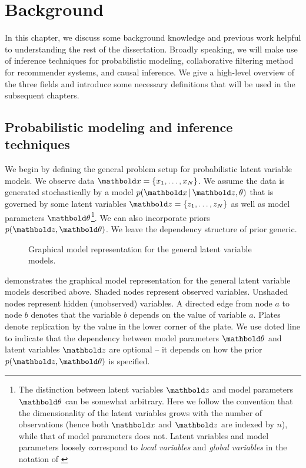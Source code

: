 

\chapter{Background}\label{chpt:background}

In this chapter, we discuss some background knowledge and previous work helpful to understanding the rest of the dissertation. 
Broadly speaking, we will make use of inference techniques for probabilistic modeling, collaborative filtering method for recommender systems, and causal inference. We give a high-level overview of the three fields and introduce some necessary definitions that will be used in the subsequent chapters. 

\section{Probabilistic modeling and inference techniques}\label{chpt:background:sec:inference}

We begin by defining the general problem setup for probabilistic latent variable models. We observe data $\mbx = \{x_1, \dots, x_N\}$. We assume the data is generated stochastically by a model $p(\mbx \g \mbz, \theta)$ that is governed by some latent variables $\mbz = \{z_1, \dots, z_N\}$ as well as model parameters $\mb\theta$\footnote{The distinction between latent variables $\mbz$ and model parameters $\mb\theta$ can be somewhat arbitrary. Here we follow the convention that the dimensionality of the latent variables grows with the number of observations (hence both $\mbx$ and $\mbz$ are indexed by $n$), while that of model parameters does not. Latent variables and model parameters loosely correspond to \textit{local variables} and \textit{global variables} in the notation of \citet{hoffman2013stochastic}}. We can also incorporate priors $p(\mbz, \mb\theta)$. We leave the dependency structure of prior generic. 

\begin{figure}[ht]
  \centering
     
  \caption{Graphical model representation for the general latent variable models.}
\label{chpt:background:fig:general}
\end{figure}

 demonstrates the graphical model representation for the general latent variable models described above. Shaded nodes represent observed variables. Unshaded nodes represent
hidden (unobserved) variables. A directed edge from node $a$ to node $b$
denotes that the variable $b$ depends on the value of variable
$a$. Plates denote replication by the value in the lower corner
of the plate. We use doted line to indicate that the dependency between model parameters $\mb\theta$ and latent variables $\mbz$ are optional -- it depends on how the prior $p(\mbz, \mb\theta)$ is specified. 

